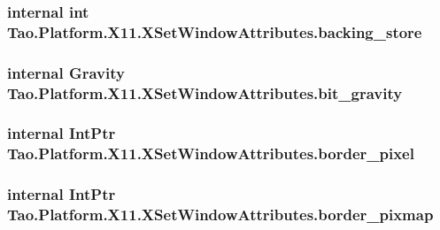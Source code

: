 \label{struct_tao_1_1_platform_1_1_x11_1_1_x_set_window_attributes_a59102c795fc00d3587c486af1350c681}
\hypertarget{struct_tao_1_1_platform_1_1_x11_1_1_x_set_window_attributes_a4849b87b00fe8148db722e511730f451}{
\subsubsection[{backing\_\-store}]{\setlength{\rightskip}{0pt plus 5cm}internal int {\bf Tao.Platform.X11.XSetWindowAttributes.backing\_\-store}}}
\label{struct_tao_1_1_platform_1_1_x11_1_1_x_set_window_attributes_a4849b87b00fe8148db722e511730f451}
\hypertarget{struct_tao_1_1_platform_1_1_x11_1_1_x_set_window_attributes_af67e6d95c672014eb2b4d594ff29c751}{
\subsubsection[{bit\_\-gravity}]{\setlength{\rightskip}{0pt plus 5cm}internal {\bf Gravity} {\bf Tao.Platform.X11.XSetWindowAttributes.bit\_\-gravity}}}
\label{struct_tao_1_1_platform_1_1_x11_1_1_x_set_window_attributes_af67e6d95c672014eb2b4d594ff29c751}
\hypertarget{struct_tao_1_1_platform_1_1_x11_1_1_x_set_window_attributes_adb7df58c0572ee3b18ea7892ee76a32d}{
\subsubsection[{border\_\-pixel}]{\setlength{\rightskip}{0pt plus 5cm}internal IntPtr {\bf Tao.Platform.X11.XSetWindowAttributes.border\_\-pixel}}}
\label{struct_tao_1_1_platform_1_1_x11_1_1_x_set_window_attributes_adb7df58c0572ee3b18ea7892ee76a32d}
\hypertarget{struct_tao_1_1_platform_1_1_x11_1_1_x_set_window_attributes_a7cd730ecfd85de45fa9ce8b7e3c6728e}{
\subsubsection[{border\_\-pixmap}]{\setlength{\rightskip}{0pt plus 5cm}internal IntPtr {\bf Tao.Platform.X11.XSetWindowAttributes.border\_\-pixmap}}}
